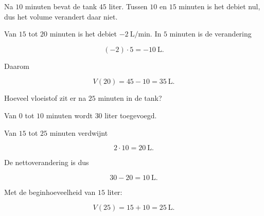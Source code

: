 \documentclass{ximera}
\begin{document}
\begin{oefening}[De tank]{\oefU\ESS}
\begin{question}
\begin{oplossing}
Na \(10\) minuten bevat de tank \(45\) liter. Tussen \(10\) en \(15\)
minuten is het debiet nul, dus het volume verandert daar niet.

Van \(15\) tot \(20\) minuten is het debiet \(-2\ \mathrm{L/min}\).
In \(5\) minuten is de verandering

\[
(-2)\cdot5=-10\ \mathrm L.
\]

Daarom

\[
V(20)=45-10=\boxed{35\ \mathrm L}.
\]

\end{oplossing}
\end{question}

\begin{question}
Hoeveel vloeistof zit er na \(25\) minuten in de tank?

\begin{oplossing}

Van \(0\) tot \(10\) minuten wordt \(30\) liter toegevoegd.

Van \(15\) tot \(25\) minuten verdwijnt

\[
2\cdot10=20\ \mathrm L.
\]

De nettoverandering is dus

\[
30-20=10\ \mathrm L.
\]

Met de beginhoeveelheid van \(15\) liter:

\[
V(25)=15+10=\boxed{25\ \mathrm L}.
\]

\end{oplossing}
\end{question}

\end{oefening}


\end{document}
